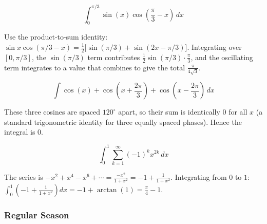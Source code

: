 \begin{questions}
\question
\[\int_0^{\pi/3}\sin(x)\cos\left(\frac\pi3-x\right)\,dx\]
\begin{solution}
Use the product-to-sum identity: $\sin x\cos(\pi/3-x) = \frac12\big[\sin(\pi/3)+\sin(2x-\pi/3)\big]$. Integrating over $[0,\pi/3]$, the $\sin(\pi/3)$ term contributes $\frac12\sin(\pi/3)\cdot\frac\pi3$, and the oscillating term integrates to a value that combines to give the total $\frac{\pi}{4\sqrt3}$.
\end{solution}

\question
\[\int \cos(x)+\cos\left(x+\frac{2\pi}3\right)+\cos\left(x-\frac{2\pi}3\right)\,dx\]
\begin{solution}
These three cosines are spaced $120^\circ$ apart, so their sum is identically $0$ for all $x$ (a standard trigonometric identity for three equally spaced phases). Hence the integral is $0$.
\end{solution}

\question
\[\int_0^1 \sum_{k=1}^{\infty}(-1)^kx^{2k}\,dx\]
\begin{solution}
The series is $-x^2+x^4-x^6+\cdots = \frac{-x^2}{1+x^2} = -1+\frac{1}{1+x^2}$. Integrating from $0$ to $1$: $\int_0^1\left(-1+\frac1{1+x^2}\right)dx = -1+\arctan(1) = \frac\pi4-1$.
\end{solution}

\end{questions}

\subsubsection*{Regular Season}

